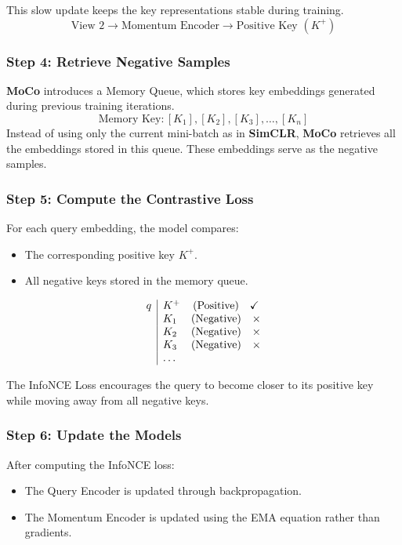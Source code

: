 This slow update keeps the key representations stable during training.
\[
\text{View 2} \longrightarrow \text{Momentum Encoder} \longrightarrow \text{Positive Key } (K^+)
\]

\subsubsection{Step 4: Retrieve Negative Samples}
\textbf{MoCo} introduces a Memory Queue, which stores key embeddings generated during previous training iterations.
\[
\text{Memory Key}: [K_1], [K_2], [K_3], \dots, [K_n]
\]
Instead of using only the current mini-batch as in \textbf{SimCLR}, \textbf{MoCo} retrieves all the embeddings stored in this queue. These embeddings serve as the negative samples.

\subsubsection{Step 5: Compute the Contrastive Loss}
For each query embedding, the model compares:
\begin{itemize}
    \item The corresponding positive key $K^+$.
    \item All negative keys stored in the memory queue.
\end{itemize}

\[
\begin{array}{c|l c}
q & K^+ & (\text{Positive}) \quad \checkmark \\
  & K_1 & (\text{Negative}) \quad \times \\
  & K_2 & (\text{Negative}) \quad \times \\
  & K_3 & (\text{Negative}) \quad \times \\
  & \dots &
\end{array}
\]

The InfoNCE Loss encourages the query to become closer to its positive key while moving away from all negative keys.

\subsubsection{Step 6: Update the Models}
After computing the InfoNCE loss:
\begin{itemize}
    \item The Query Encoder is updated through backpropagation.
    \item The Momentum Encoder is updated using the EMA equation rather than gradients.
\end{itemize}

